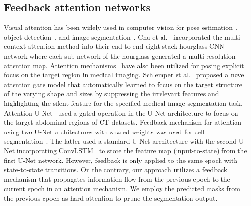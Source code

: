 \documentclass[journal]{IEEEtran}
\begin{document}
\subsection{Feedback attention networks}
Visual attention has been widely used in computer vision for  pose estimation~\cite{Chu2017MulticontextAF}, {object detection~\cite{chen2017sca-cnn}, and image segmentation~\cite{CY2016Attention,ye2019cross}}. {Chu et al.~\cite{Chu2017MulticontextAF} incorporated the multi-context attention method into their end-to-end eight stack hourglass \ac{CNN} network where each sub-network of the hourglass generated a multi-resolution attention map}.  Attention mechanisms~\cite{LUNDERVOLD2019102,SCHLEMPER2019197} have also been utilized for posing explicit focus on the target region in medical imaging.  {Schlemper et al.~\cite{SCHLEMPER2019197} proposed a novel attention gate model that automatically learned to focus on the target structure of the varying shape and sizes by suppressing the irrelevant features and highlighting the silent feature for the specified medical image segmentation task}. Attention U-Net~\cite{oktay2018attention} used a gated operation in the U-Net architecture to focus on the target abdominal regions of CT datasets. Feedback mechanism for attention using two U-Net architectures with shared weights was used for cell segmentation~\cite{tsuda2020feedback,shibuya2020feedback}. The latter used a standard U-Net architecture with the second U-Net incorporating ConvLSTM~\cite{NIPS2015_07563a3f} to store the feature map (input-to-state) from the first U-Net network. However, feedback is only applied to the same epoch with state-to-state transitions. On the contrary, our approach utilizes a feedback mechanism that propagates information flow from the previous epoch to the current epoch in an attention mechanism. We employ the predicted masks from the previous epoch as hard attention to prune the segmentation output.
\end{document}

